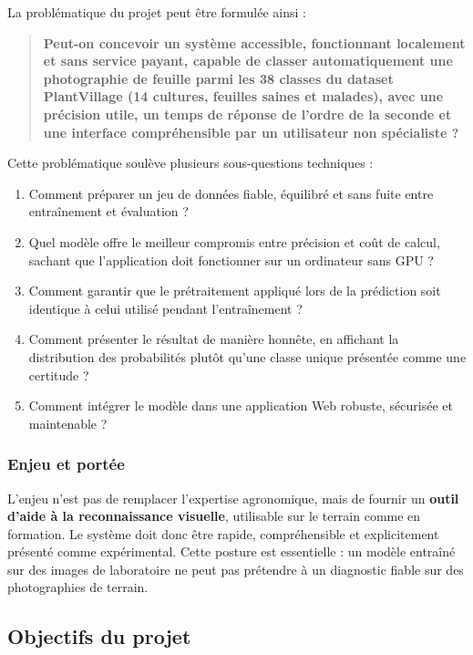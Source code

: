 \documentclass[10pt,a4paper]{article}
\begin{document}
La problématique du projet peut être formulée ainsi :

\begin{quote}\small
\textbf{Peut-on concevoir un système accessible, fonctionnant localement et sans service payant, capable de classer automatiquement une photographie de feuille parmi les 38 classes du dataset PlantVillage (14 cultures, feuilles saines et malades), avec une précision utile, un temps de réponse de l'ordre de la seconde et une interface compréhensible par un utilisateur non spécialiste ?}
\end{quote}

Cette problématique soulève plusieurs sous-questions techniques :

\begin{enumerate}
\item Comment préparer un jeu de données fiable, équilibré et sans fuite entre entraînement et évaluation ?
\item Quel modèle offre le meilleur compromis entre précision et coût de calcul, sachant que l'application doit fonctionner sur un ordinateur sans GPU ?
\item Comment garantir que le prétraitement appliqué lors de la prédiction soit identique à celui utilisé pendant l'entraînement ?
\item Comment présenter le résultat de manière honnête, en affichant la distribution des probabilités plutôt qu'une classe unique présentée comme une certitude ?
\item Comment intégrer le modèle dans une application Web robuste, sécurisée et maintenable ?
\end{enumerate}

\subsubsection{Enjeu et portée}

L'enjeu n'est pas de remplacer l'expertise agronomique, mais de fournir un \textbf{outil d'aide à la reconnaissance visuelle}, utilisable sur le terrain comme en formation. Le système doit donc être rapide, compréhensible et explicitement présenté comme expérimental. Cette posture est essentielle : un modèle entraîné sur des images de laboratoire ne peut pas prétendre à un diagnostic fiable sur des photographies de terrain.

\subsection{Objectifs du projet}
\end{document}
